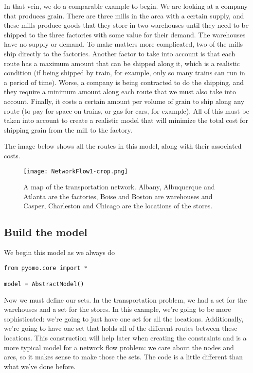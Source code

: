 \documentclass{article}
\begin{document}
In that vein, we do a comparable example to begin.  We are looking at a company that produces grain.  There are three mills in the area with a certain supply, and these mills produce goods that they store in two warehouses until they need to be shipped to the three factories with some value for their demand.  The warehouses have no supply or demand.  To make matters more complicated, two of the mills ship directly to the factories.  Another factor to take into account is that each route has a maximum amount that can be shipped along it, which is a realistic condition (if being shipped by train, for example, only so many trains can run in a period of time).  Worse, a company is being contracted to do the shipping, and they require a minimum amount along each route that we must also take into account.  Finally, it costs a certain amount per volume of grain to ship along any route (to pay for space on trains, or gas for cars, for example).  All of this must be taken into account to create a realistic model that will minimize the total cost for shipping grain from the mill to the factory.

The image below shows all the routes in this model, along with their associated costs.

\begin{figure}
\begin{center}
 \texttt{[image: NetworkFlow1-crop.png]}
\end{center}
\caption{A map of the transportation network.  Albany, Albuquerque and Atlanta are the factories, Boise and Boston are warehouses and Casper, Charleston and Chicago are the locations of the stores.}
\end{figure} 

\subsection*{Build the model}

We begin this model as we always do

\begin{verbatim}
from pyomo.core import *

model = AbstractModel()
\end{verbatim}

Now we must define our sets.  In the transportation problem, we had a set for the warehouses and a set for the stores.  In this example, we're going to be more sophisticated: we're going to just have one set for all the locations.  Additionally, we're going to have one set that holds all of the different routes between these locations.  This construction will help later when creating the constraints and is a more typical model for a network flow problem: we care about the nodes and arcs, so it makes sense to make those the sets.  The code is a little different than what we've done before.
\end{document}
